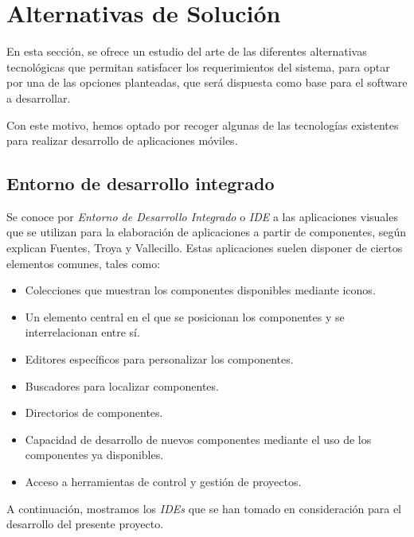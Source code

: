 

\section{Alternativas de Solución}
En esta sección, se ofrece un estudio del arte de las diferentes alternativas tecnológicas que permitan satisfacer 
los requerimientos del sistema, para optar por una de las opciones planteadas, que será dispuesta como base 
para el software a desarrollar.\medskip

Con este motivo, hemos optado por recoger algunas de las tecnologías existentes para realizar desarrollo de aplicaciones 
móviles.

\subsection{Entorno de desarrollo integrado}
Se conoce por \textit{Entorno de Desarrollo Integrado} o \textit{IDE} a las aplicaciones visuales que se utilizan para 
la elaboración de aplicaciones a partir de componentes, según explican Fuentes, Troya y Vallecillo. \autocite*{Fuentes}
Estas aplicaciones suelen disponer de ciertos elementos comunes, tales como:
\newpage
\begin{itemize}
    \item Colecciones que muestran los componentes disponibles mediante iconos.
    \item Un elemento central en el que se posicionan los componentes y se interrelacionan entre sí.
    \item Editores específicos para personalizar los componentes.
    \item Buscadores para localizar componentes.
    \item Directorios de componentes.
    \item Capacidad de desarrollo de nuevos componentes mediante el uso de los componentes ya disponibles.
    \item Acceso a herramientas de control y gestión de proyectos.
\end{itemize}

A continuación, mostramos los \textit{IDEs} que se han tomado en consideración para el desarrollo del presente proyecto.

